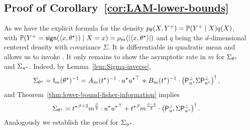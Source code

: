 \subsection{Proof of Corollary~\ref{cor:LAM-lower-bounds}} \label{proof:LAM-lower-bounds}
As we have the explicit formula for the density $p_\theta(X,Y^+) = \mathbb{P}(Y^+ \mid X) q(X)$, with $\mathbb{P}(Y^+ = \mathsf{sign}(\langle x, \theta^\star\rangle) \mid X = x) = \rho_m(|\langle x, \theta^\star\rangle|) $ and $q$ being the $d$-dimensional centered density with covariance $\Sigma$. It is differentiable in quadratic mean and allows us to invoke \citet[Thm.~8.9]{VanDerVaart98}. It only remains to show the asymptotic rate in $m$ for $\Sigma_{\theta^\star}$ and $\Sigma_{u^\star}$. Indeed, by Lemma~\ref{lem:Sigma-inverse},
\begin{align*}
	\Sigma_{\theta^\star} = \mathsf{I}_m(\theta^\star)^{-1} = A_m (t^\star)^{-1} \cdot u^\star {u^\star}^\top + B_m(t^\star)^{-1} \cdot \left({\mathsf{P}_{u^\star}^\perp \Sigma \mathsf{P}_{u^\star}^\perp}\right)^\dagger,
\end{align*}
and  Theorem~\ref{thm:lower-bound-fisher-information} implies
\begin{align*}
	\Sigma_{\theta^\star} \asymp {t^\star}^{\beta +2} m^{\frac{\beta}{2}} \cdot u^\star {u^\star}^\top +  {t^\star}^{\beta}m^{\frac{\beta-2}{2}}  \cdot \left({\mathsf{P}_{u^\star}^\perp \Sigma \mathsf{P}_{u^\star}^\perp}\right)^\dagger.
\end{align*}
Analogously we establish the proof for $\Sigma_{u^\star}$.
